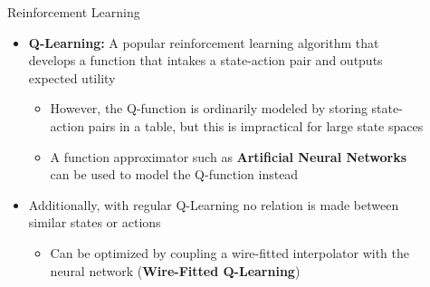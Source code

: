 \documentclass[final]{beamer}
\newlength{\sepwid}
\newlength{\onecolwid}
\newlength{\twocolwid}
\begin{document}
\begin{frame}[t]
\begin{columns}[t]
\begin{column}{\onecolwid}
\end{column}

\begin{column}{\sepwid}\end{column}

\begin{column}{\twocolwid}

\vspace{-1.65cm}

\begin{columns}[t,totalwidth=\twocolwid]

	\begin{column}{\onecolwid}
		\begin{block}{Reinforcement Learning}
			\begin{itemize}
				\item \textbf{Q-Learning:} A popular reinforcement learning algorithm that develops a function that intakes a state-action pair and outputs expected utility
				\begin{itemize}
					\item However, the Q-function is ordinarily modeled by storing state-action pairs in a table, but this is impractical for large state spaces
					\item A function approximator such as \textbf{Artificial Neural Networks} can be used to model the Q-function instead
				\end{itemize}
				\item Additionally, with regular Q-Learning no relation is made between similar states or actions
				\begin{itemize}
					\item Can be optimized by coupling a wire-fitted interpolator with the neural network (\textbf{Wire-Fitted Q-Learning})
				\end{itemize}


\end{itemize}
\end{block}
\end{column}
\end{columns}
\end{column}
\end{columns}
\end{frame}
\end{document}
